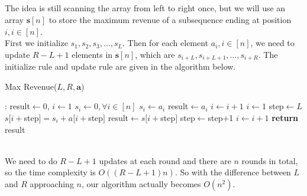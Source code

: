 \documentclass[12pt,letterpaper]{article}
\begin{document}
\subsection{}
The idea is still scanning the array from left to right once,
but we will use an array $\boldsymbol{s}[n]$ to store the maximum revenue
of a subsequence ending at position $i,i\in[n]$.\\
First we initialize $s_1,s_2,s_3,\dots,s_L$.
Then for each element $a_i,i\in[n]$, 
we need to update $R-L+1$ elements in $\boldsymbol{s}[n]$,
which are $s_{i+L},s_{i+L+1},\dots,s_{i+R}$.
The initialize rule and update rule are given in the algorithm below.
\begin{algorithm}
  \caption{Max Revenue($L,R,\boldsymbol{a}$)}\label{alg:mrlrNsquare}
  \begin{algorithmic}[1]
  :
  \State result$\gets0$, $i\gets1$ $s_i\gets 0,\forall i\in[n]$
  \State $s_i\gets a_i$
  \EndIf
  \State result$\gets a_i$
  \EndIf
  \State $i\gets i+1$
  \EndWhile
  \State $i\gets1$
  \State step$\gets L$
  \State $s[i+$step$]=s_i+a[i+$step$]$
  \EndIf
  \State result$\gets s[i+$step$]$ 
  \EndIf
  \State step$\gets$step+1
  \EndWhile
  \State $i\gets i+1$ 
  \EndWhile
  \State \textbf{return} result
  \EndProcedure
  \end{algorithmic}
\end{algorithm}\\
We need to do $R-L+1$ updates at each round and there are $n$ rounds in total,
so the time complexity is $O((R-L+1)n)$.
So with the difference between $L$ and $R$ approaching $n$,
our algorithm actually becomes $O(n^2)$.

\newpage
\end{document}
